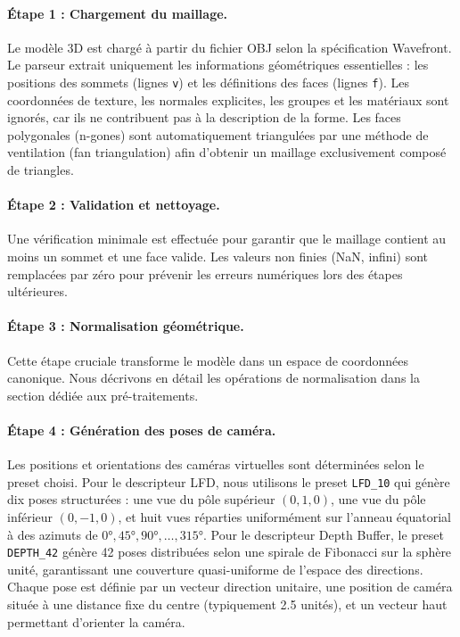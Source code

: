 \documentclass[11pt,a4paper,oneside]{report}
\begin{document}
\paragraph{Étape 1 : Chargement du maillage.} Le modèle 3D est chargé à partir du fichier OBJ selon la spécification Wavefront. Le parseur extrait uniquement les informations géométriques essentielles : les positions des sommets (lignes \texttt{v}) et les définitions des faces (lignes \texttt{f}). Les coordonnées de texture, les normales explicites, les groupes et les matériaux sont ignorés, car ils ne contribuent pas à la description de la forme. Les faces polygonales (n-gones) sont automatiquement triangulées par une méthode de ventilation (fan triangulation) afin d'obtenir un maillage exclusivement composé de triangles.

\paragraph{Étape 2 : Validation et nettoyage.} Une vérification minimale est effectuée pour garantir que le maillage contient au moins un sommet et une face valide. Les valeurs non finies (NaN, infini) sont remplacées par zéro pour prévenir les erreurs numériques lors des étapes ultérieures.

\paragraph{Étape 3 : Normalisation géométrique.} Cette étape cruciale transforme le modèle dans un espace de coordonnées canonique. Nous décrivons en détail les opérations de normalisation dans la section dédiée aux pré-traitements.

\paragraph{Étape 4 : Génération des poses de caméra.} Les positions et orientations des caméras virtuelles sont déterminées selon le preset choisi. Pour le descripteur LFD, nous utilisons le preset \texttt{LFD\_10} qui génère dix poses structurées : une vue du pôle supérieur $(0, 1, 0)$, une vue du pôle inférieur $(0, -1, 0)$, et huit vues réparties uniformément sur l'anneau équatorial à des azimuts de $0°, 45°, 90°, \ldots, 315°$. Pour le descripteur Depth Buffer, le preset \texttt{DEPTH\_42} génère 42 poses distribuées selon une spirale de Fibonacci sur la sphère unité, garantissant une couverture quasi-uniforme de l'espace des directions. Chaque pose est définie par un vecteur direction unitaire, une position de caméra située à une distance fixe du centre (typiquement 2.5 unités), et un vecteur haut permettant d'orienter la caméra.
\end{document}
